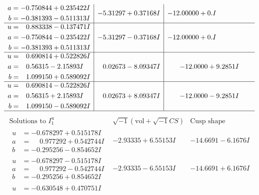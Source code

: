 \documentclass[1p]{elsarticle_modified}
\theoremstyle{definition}
\newcommand{\I}{\sqrt{-1}}
\begin{document}
$$\begin{array}{c|c|c}
\begin{aligned}
a &= -0.750844 + 0.235422 I \\
b &= -0.381393 - 0.511313 I\end{aligned}
 & -5.31297 + 0.37168 I & -12.00000 + 0. I\phantom{ +0.000000I} \\ \hline\begin{aligned}
u &= \phantom{-}0.883338 - 0.137471 I \\
a &= -0.750844 - 0.235422 I \\
b &= -0.381393 + 0.511313 I\end{aligned}
 & -5.31297 - 0.37168 I & -12.00000 + 0. I\phantom{ +0.000000I} \\ \hline\begin{aligned}
u &= \phantom{-}0.690814 + 0.522826 I \\
a &= \phantom{-}0.56315 - 2.15893 I \\
b &= \phantom{-}1.099150 + 0.589092 I\end{aligned}
 & \phantom{-}0.02673 - 8.09347 I & -12.0000 + 9.2851 I \\ \hline\begin{aligned}
u &= \phantom{-}0.690814 - 0.522826 I \\
a &= \phantom{-}0.56315 + 2.15893 I \\
b &= \phantom{-}1.099150 - 0.589092 I\end{aligned}
 & \phantom{-}0.02673 + 8.09347 I & -12.0000 - 9.2851 I\\
 \hline 
 \end{array}$$\newpage$$\begin{array}{c|c|c}  
\text{Solutions to }I^u_{1}& \I (\text{vol} + \sqrt{-1}CS) & \text{Cusp shape}\\
 \hline 
\begin{aligned}
u &= -0.678297 + 0.515178 I \\
a &= \phantom{-}0.977292 + 0.542744 I \\
b &= -0.295256 - 0.854652 I\end{aligned}
 & -2.93335 + 6.55153 I & -14.6691 - 6.1676 I \\ \hline\begin{aligned}
u &= -0.678297 - 0.515178 I \\
a &= \phantom{-}0.977292 - 0.542744 I \\
b &= -0.295256 + 0.854652 I\end{aligned}
 & -2.93335 - 6.55153 I & -14.6691 + 6.1676 I \\ \hline\begin{aligned}
u &= -0.630548 + 0.470751 I \\

\end{aligned}
\end{array}$$
\end{document}
